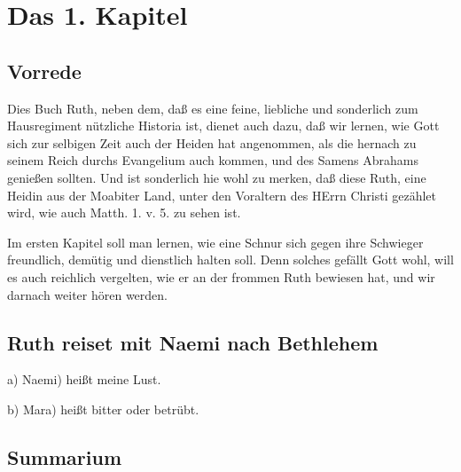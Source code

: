 \chapter{Das 1. Kapitel}

\section{Vorrede}

Dies Buch Ruth, neben dem, daß es eine feine, liebliche und sonderlich zum Hausregiment nützliche Historia ist, dienet auch dazu, daß wir lernen, wie Gott sich zur selbigen Zeit auch der Heiden hat angenommen, als die hernach zu seinem Reich durchs Evangelium auch kommen, und des Samens Abrahams genießen sollten. Und ist sonderlich hie wohl zu merken, daß diese Ruth, eine Heidin aus der Moabiter Land, unter den Voraltern des HErrn Christi gezählet wird, wie auch Matth. 1. v. 5. zu sehen ist.

Im ersten Kapitel soll man lernen, wie eine Schnur sich gegen ihre Schwieger freundlich, demütig und dienstlich halten soll. Denn solches gefällt Gott wohl, will es auch reichlich vergelten, wie er an der frommen Ruth bewiesen hat, und wir darnach weiter hören werden.

\section{Ruth reiset mit Naemi nach Bethlehem}
a) Naemi) heißt meine Lust.

b) Mara) heißt bitter oder betrübt.

\section{Summarium}

